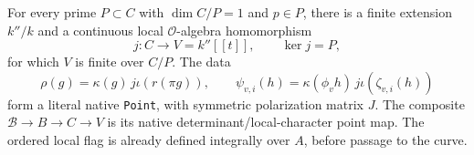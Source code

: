 \begin{theorem}
\label{AC-G104-point}
For every prime \(P\subset C\) with \(\dim C/P=1\) and \(p\in P\),
there is a finite extension \(k''/k\) and a continuous local
\(\mathcal O\)-algebra homomorphism
\[
 j:C\longrightarrow V=k''[[t]],\qquad \ker j=P,
\tag{G104.3}
\]
for which \(V\) is finite over \(C/P\).  The data
\[
 \rho(g)=\kappa(g)\,j\iota(r(\pi g)),\qquad
 \psi_{v,i}(h)=\kappa(\phi_vh)\,j\iota(\zeta_{v,i}(h))
\tag{G104.4}
\]
form a literal native \texttt{Point}, with symmetric polarization
matrix \(J\).  The composite \(\mathscr B\to B\to C\to V\)
is its native determinant/local-character point map.
The ordered local flag is already defined integrally over \(A\),
before passage to the curve.
\end{theorem}

